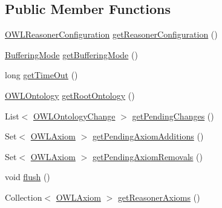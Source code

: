 \subsection*{Public Member Functions}
\begin{DoxyCompactItemize}
\item 
\hyperlink{interfaceorg_1_1semanticweb_1_1owlapi_1_1reasoner_1_1_o_w_l_reasoner_configuration}{O\-W\-L\-Reasoner\-Configuration} \hyperlink{classorg_1_1semanticweb_1_1owlapi_1_1reasoner_1_1impl_1_1_o_w_l_reasoner_base_a5897e00d2b18e876fb4f6cd5ceae3b5b}{get\-Reasoner\-Configuration} ()
\item 
\hyperlink{enumorg_1_1semanticweb_1_1owlapi_1_1reasoner_1_1_buffering_mode}{Buffering\-Mode} \hyperlink{classorg_1_1semanticweb_1_1owlapi_1_1reasoner_1_1impl_1_1_o_w_l_reasoner_base_a6d817012df943af81bed84afaa067ac2}{get\-Buffering\-Mode} ()
\item 
long \hyperlink{classorg_1_1semanticweb_1_1owlapi_1_1reasoner_1_1impl_1_1_o_w_l_reasoner_base_af55342eaaabb1b72dacfde7a181b93d2}{get\-Time\-Out} ()
\item 
\hyperlink{interfaceorg_1_1semanticweb_1_1owlapi_1_1model_1_1_o_w_l_ontology}{O\-W\-L\-Ontology} \hyperlink{classorg_1_1semanticweb_1_1owlapi_1_1reasoner_1_1impl_1_1_o_w_l_reasoner_base_af82ce0d95d214e54deae6334a7c9faa9}{get\-Root\-Ontology} ()
\item 
List$<$ \hyperlink{classorg_1_1semanticweb_1_1owlapi_1_1model_1_1_o_w_l_ontology_change}{O\-W\-L\-Ontology\-Change} $>$ \hyperlink{classorg_1_1semanticweb_1_1owlapi_1_1reasoner_1_1impl_1_1_o_w_l_reasoner_base_a6b64c8c642984519b0019f5110e2e30a}{get\-Pending\-Changes} ()
\item 
Set$<$ \hyperlink{interfaceorg_1_1semanticweb_1_1owlapi_1_1model_1_1_o_w_l_axiom}{O\-W\-L\-Axiom} $>$ \hyperlink{classorg_1_1semanticweb_1_1owlapi_1_1reasoner_1_1impl_1_1_o_w_l_reasoner_base_a7cf5f5cd46534299c2908cd9a278e086}{get\-Pending\-Axiom\-Additions} ()
\item 
Set$<$ \hyperlink{interfaceorg_1_1semanticweb_1_1owlapi_1_1model_1_1_o_w_l_axiom}{O\-W\-L\-Axiom} $>$ \hyperlink{classorg_1_1semanticweb_1_1owlapi_1_1reasoner_1_1impl_1_1_o_w_l_reasoner_base_af305be00df7223407203f5a3281d5da5}{get\-Pending\-Axiom\-Removals} ()
\item 
void \hyperlink{classorg_1_1semanticweb_1_1owlapi_1_1reasoner_1_1impl_1_1_o_w_l_reasoner_base_a6645d41d257eabb48adc84d34b34f082}{flush} ()
\item 
Collection$<$ \hyperlink{interfaceorg_1_1semanticweb_1_1owlapi_1_1model_1_1_o_w_l_axiom}{O\-W\-L\-Axiom} $>$ \hyperlink{classorg_1_1semanticweb_1_1owlapi_1_1reasoner_1_1impl_1_1_o_w_l_reasoner_base_a7748d4858a55a5e5263bc47ea1ae8e27}{get\-Reasoner\-Axioms} ()

\end{DoxyCompactItemize}
